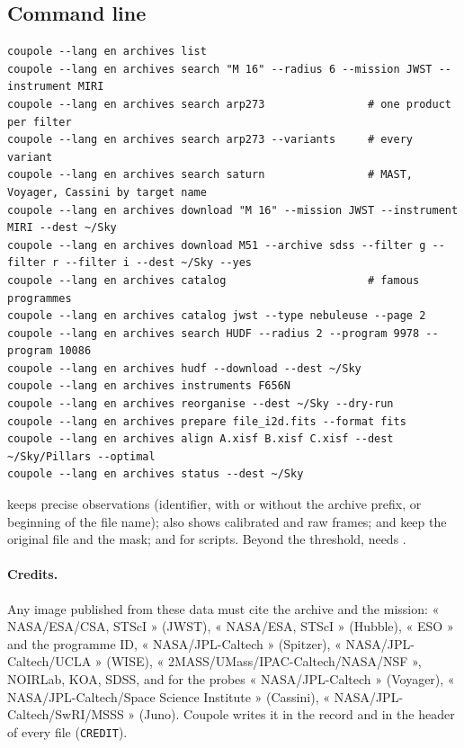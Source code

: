 \subsection{Command line}
\begin{verbatim}
coupole --lang en archives list
coupole --lang en archives search "M 16" --radius 6 --mission JWST --instrument MIRI
coupole --lang en archives search arp273                # one product per filter
coupole --lang en archives search arp273 --variants     # every variant
coupole --lang en archives search saturn                # MAST, Voyager, Cassini by target name
coupole --lang en archives download "M 16" --mission JWST --instrument MIRI --dest ~/Sky
coupole --lang en archives download M51 --archive sdss --filter g --filter r --filter i --dest ~/Sky --yes
coupole --lang en archives catalog                      # famous programmes
coupole --lang en archives catalog jwst --type nebuleuse --page 2
coupole --lang en archives search HUDF --radius 2 --program 9978 --program 10086
coupole --lang en archives hudf --download --dest ~/Sky
coupole --lang en archives instruments F656N
coupole --lang en archives reorganise --dest ~/Sky --dry-run
coupole --lang en archives prepare file_i2d.fits --format fits
coupole --lang en archives align A.xisf B.xisf C.xisf --dest ~/Sky/Pillars --optimal
coupole --lang en archives status --dest ~/Sky
\end{verbatim}
 keeps precise observations (identifier, with or without the archive prefix, or beginning of the file
name);  also shows calibrated and raw frames;  and  keep the
original file and the mask;  and  for scripts. Beyond the threshold,  needs
.

\paragraph{Credits.} Any image published from these data must cite the archive and the mission: « NASA/ESA/CSA,
STScI » (JWST), « NASA/ESA, STScI » (Hubble), « ESO » and the programme ID, « NASA/JPL-Caltech » (Spitzer),
« NASA/JPL-Caltech/UCLA » (WISE), « 2MASS/UMass/IPAC-Caltech/NASA/NSF », NOIRLab, KOA, SDSS, and for the probes
« NASA/JPL-Caltech » (Voyager), « NASA/JPL-Caltech/Space Science Institute » (Cassini), « NASA/JPL-Caltech/SwRI/MSSS »
(Juno). Coupole writes it in the record and in the header of every file (\texttt{CREDIT}).

